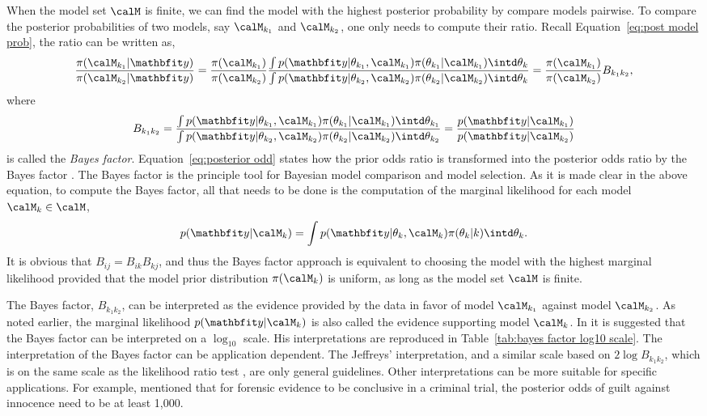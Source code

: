 When the model set $\calM$ is finite, we can find the model with the highest
posterior probability by compare models pairwise. To compare the posterior
probabilities of two models, say $\calM_{k_1}$ and $\calM_{k_2}$, one only
needs to compute their ratio. Recall Equation~\eqref{eq:post model prob}, the
ratio can be written as,
\begin{equation}
  \frac{\pi(\calM_{k_1}|\data)}{\pi(\calM_{k_2}|\data)}
  = \frac{\pi(\calM_{k_1})}{\pi(\calM_{k_2})} \frac
  {\int p(\data|\theta_{k_1},\calM_{k_1})\pi(\theta_{k_1}|\calM_{k_1})
      \intd\theta_k}
  {\int p(\data|\theta_{k_2},\calM_{k_2})\pi(\theta_{k_2}|\calM_{k_2})
      \intd\theta_k}
  = \frac{\pi(\calM_{k_1})}{\pi(\calM_{k_2})}B_{k_1k_2},
  \label{eq:posterior odd}
\end{equation}
where
\begin{equation}
  B_{k_1k_2} = \frac
  {\int p(\data|\theta_{k_1},\calM_{k_1})\pi(\theta_{k_1}|\calM_{k_1})
      \intd\theta_{k_1}}
  {\int p(\data|\theta_{k_2},\calM_{k_2})\pi(\theta_{k_2}|\calM_{k_2})
      \intd\theta_{k_2}}
    = \frac{p(\data|\calM_{k_1})}{p(\data|\calM_{k_2})}
  \label{eq:bayes factor}
\end{equation}
is called the \emph{Bayes factor}. Equation~\eqref{eq:posterior odd} states
how the prior odds ratio is transformed into the posterior odds ratio by the
Bayes factor \cite{Kass:1995vb}. The Bayes factor is the principle tool for
Bayesian model comparison and model selection. As it is made clear in the
above equation, to compute the Bayes factor, all that needs to be done is the
computation of the marginal likelihood for each model $\calM_k\in\calM$,
\begin{equation*}
  p(\data|\calM_k) =
  \int p(\data|\theta_k,\calM_k)\pi(\theta_k|k)\intd\theta_k.
\end{equation*}
It is obvious that $B_{ij} = B_{ik}B_{kj}$, and thus the Bayes factor
approach is equivalent to choosing the model with the highest marginal
likelihood provided that the model prior distribution $\pi(\calM_k)$ is
uniform, as long as the model set $\calM$ is finite.

The Bayes factor, $B_{k_1k_2}$, can be interpreted as the evidence provided
by the data in favor of model $\calM_{k_1}$ against model $\calM_{k_2}$. As
noted earlier, the marginal likelihood $p(\data|\calM_k)$ is also called the
evidence supporting model $\calM_k$. In \cite{Jeffreys:1961ua} it is
suggested that the Bayes factor can be interpreted on a $\log_{10}$ scale.
His interpretations are reproduced in Table~\ref{tab:bayes factor log10
scale}. The interpretation of the Bayes factor can be application dependent.
The Jeffreys' interpretation, and a similar scale based on $2\log
B_{k_1k_2}$, which is on the same scale as the likelihood ratio test
\cite{Kass:1995vb}, are only general guidelines. Other interpretations can be
more suitable for specific applications. For example, \cite{Kass:1995vb}
mentioned that for forensic evidence to be conclusive in a criminal trial,
the posterior odds of guilt against innocence need to be at least 1,000.

